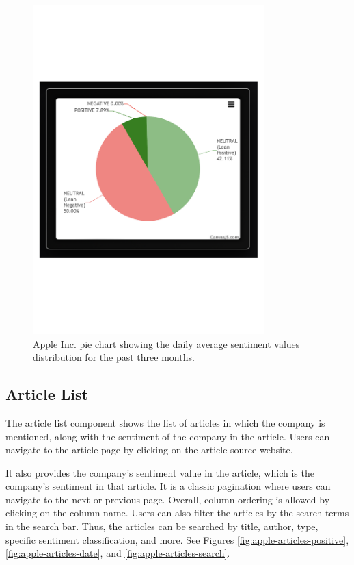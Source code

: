 \begin{figure}[htbp]
    \centering
    \includegraphics[width=0.8\textwidth]{img/user/apple-pie-chart-a.pdf}
    \caption{Apple Inc. pie chart showing the daily average sentiment values distribution for the past three months.}
    \label{fig:apple-pie}
\end{figure}

\subsection{Article List}
\label{subsec:article-list}
The article list component shows the list of articles in which the company is mentioned, along with the sentiment of the company in the article. Users can navigate to the article page by clicking on the article source website. 

It also provides the company's sentiment value in the article, which is the company's sentiment in that article. It is a classic pagination where users can navigate to the next or previous page. Overall, column ordering is allowed by clicking on the column name. Users can also filter the articles by the search terms in the search bar. Thus, the articles can be searched by title, author, type, specific sentiment classification, and more. See Figures \ref{fig:apple-articles-positive}, \ref{fig:apple-articles-date}, and \ref{fig:apple-articles-search}.


